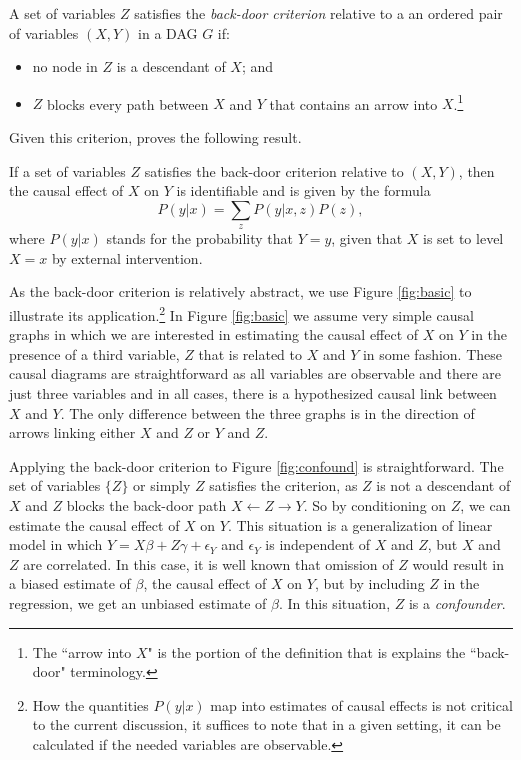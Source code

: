 \documentclass[11pt,reqno]{amsart}
\begin{document}
\begin{definition}
A set of variables $Z$ satisfies the \emph{back-door criterion} relative to a an ordered pair of variables $(X, Y)$ in a 
	DAG $G$ if:
	\begin{itemize}
		\item no node in $Z$ is a descendant of $X$; and
		\item $Z$ blocks every path between $X$ and $Y$ that contains an arrow into $X$.\footnote{The ``arrow into $X$" is the portion of the definition that is explains the ``back-door" terminology.}
	\end{itemize}
\end{definition}
Given this criterion, \citet[p.\,79]{Pearl:2009vo} proves the following result.
\begin{theorem}
	If a set of variables $Z$ satisfies the back-door criterion relative to $(X, Y)$, then the causal effect of $X$ on $Y$ is identifiable and is given by the formula 
	\[ P(y | x) = \sum_{z} P(y | x, z) P(z), \]
where $P(y|x)$ stands for the probability that $Y = y$, given that $X$ is set to level $X=x$ by external intervention.
\end{theorem}

As the back-door criterion is relatively abstract, we use Figure \ref{fig:basic} to illustrate its application.\footnote{
How the quantities $P(y|x)$ map into estimates of causal effects is not critical to the current discussion, it suffices to note that in a given setting, it can be calculated if the needed variables are observable.}
In Figure \ref{fig:basic} we assume very simple causal graphs in which we are interested in estimating the causal effect of $X$ on $Y$ in the presence of a third variable, $Z$ that is related to $X$ and $Y$ in some fashion.
These causal diagrams are straightforward as all variables are observable and there are just three variables and in all cases, there is a hypothesized causal link between $X$ and $Y$.
The only difference between the three graphs is in the direction of arrows linking either $X$ and $Z$ or $Y$ and $Z$.

Applying the back-door criterion to Figure \ref{fig:confound} is straightforward. 
The set of variables $\{Z\}$ or simply $Z$ satisfies the criterion, as $Z$ is not a descendant of $X$ and $Z$ blocks the back-door path $X \leftarrow Z \rightarrow Y$.
So by conditioning on $Z$, we can estimate the causal effect of $X$ on $Y$.
This situation is a generalization of linear model in which $Y = X \beta + Z \gamma + \epsilon_Y$ and $\epsilon_Y$ is independent of $X$ and $Z$, but $X$ and $Z$ are correlated.
In this case, it is well known that omission of $Z$ would result in a biased estimate of $\beta$, the causal effect of $X$ on $Y$, but by including $Z$ in the regression, we get an unbiased estimate of $\beta$.
In this situation, $Z$ is a \emph{confounder}.
\end{document}
